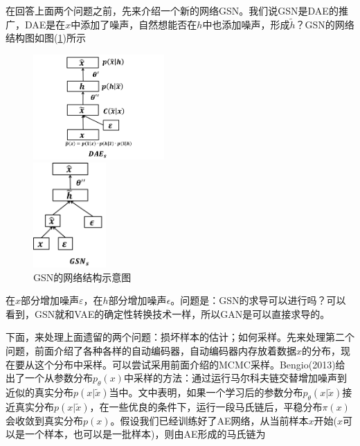         \par
        在回答上面两个问题之前，先来介绍一个新的网络GSN。我们说GSN是DAE的推广，DAE是在$x$中添加了噪声，自然想能否在$h$中也添加噪声，形成$\tilde{h}$？GSN的网络结构图如图(\ref{fig:GSN的网络结构示意图})所示
                \begin{figure}[H]
                  \centering
                  \begin{varwidth}[t]{\textwidth}
                    \vspace{0pt}
                \includegraphics[height=4cm]{images/GSN_net_structure1.jpg}
                  \end{varwidth}
                  \qquad
                  \begin{varwidth}[t]{\textwidth}
                    \vspace{0pt}
                    \includegraphics[height=4cm]{images/GSN_net_structure2.jpg}
                  \end{varwidth}
            \caption{GSN的网络结构示意图}
            \label{fig:GSN的网络结构示意图}
                \end{figure}
        在$x$部分增加噪声$\varepsilon$，在$h$部分增加噪声$\epsilon$。问题是：GSN的求导可以进行吗？可以看到，GSN就和VAE的确定性转换技术一样，所以GAN是可以直接求导的。
        \par
        下面，来处理上面遗留的两个问题：损坏样本的估计；如何采样。先来处理第二个问题，前面介绍了各种各样的自动编码器，自动编码器内存放着数据$x$的分布，现在要从这个分布中采样。可以尝试采用前面介绍的MCMC采样。Bengio(2013)给出了一个从参数分布$p_\theta(x)$中采样的方法：通过运行马尔科夫链交替增加噪声到近似的真实分布$p(x|\tilde{x})$当中。文中表明，如果一个学习后的参数分布$p_\theta(x|\tilde{x})$接近真实分布$p(x|\tilde{x})$，在一些优良的条件下，运行一段马氏链后，平稳分布$\pi(x)$会收敛到真实分布$p(x)$。假设我们已经训练好了AE网络，从当前样本$x$开始($x$可以是一个样本，也可以是一批样本)，则由AE形成的马氏链为
